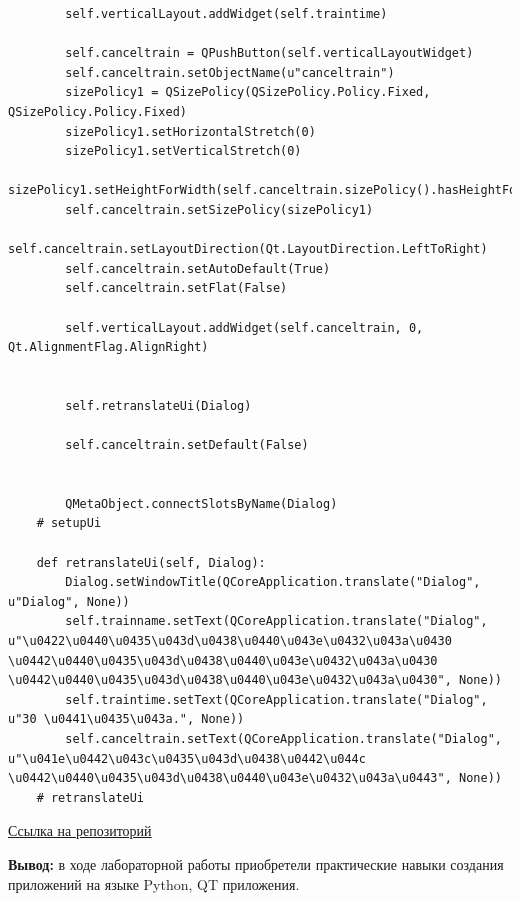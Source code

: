 \documentclass[a4paper,14pt]{extarticle}
\begin{document}
\begin{verbatim}
        self.verticalLayout.addWidget(self.traintime)

        self.canceltrain = QPushButton(self.verticalLayoutWidget)
        self.canceltrain.setObjectName(u"canceltrain")
        sizePolicy1 = QSizePolicy(QSizePolicy.Policy.Fixed, QSizePolicy.Policy.Fixed)
        sizePolicy1.setHorizontalStretch(0)
        sizePolicy1.setVerticalStretch(0)
        sizePolicy1.setHeightForWidth(self.canceltrain.sizePolicy().hasHeightForWidth())
        self.canceltrain.setSizePolicy(sizePolicy1)
        self.canceltrain.setLayoutDirection(Qt.LayoutDirection.LeftToRight)
        self.canceltrain.setAutoDefault(True)
        self.canceltrain.setFlat(False)

        self.verticalLayout.addWidget(self.canceltrain, 0, Qt.AlignmentFlag.AlignRight)


        self.retranslateUi(Dialog)

        self.canceltrain.setDefault(False)


        QMetaObject.connectSlotsByName(Dialog)
    # setupUi

    def retranslateUi(self, Dialog):
        Dialog.setWindowTitle(QCoreApplication.translate("Dialog", u"Dialog", None))
        self.trainname.setText(QCoreApplication.translate("Dialog", u"\u0422\u0440\u0435\u043d\u0438\u0440\u043e\u0432\u043a\u0430 \u0442\u0440\u0435\u043d\u0438\u0440\u043e\u0432\u043a\u0430 \u0442\u0440\u0435\u043d\u0438\u0440\u043e\u0432\u043a\u0430", None))
        self.traintime.setText(QCoreApplication.translate("Dialog", u"30 \u0441\u0435\u043a.", None))
        self.canceltrain.setText(QCoreApplication.translate("Dialog", u"\u041e\u0442\u043c\u0435\u043d\u0438\u0442\u044c \u0442\u0440\u0435\u043d\u0438\u0440\u043e\u0432\u043a\u0443", None))
    # retranslateUi
\end{verbatim}

\href{https://gitlab.com/vlad4052/2024_pv223_vladislav_10}{Ссылка на репозиторий}

\textbf{Вывод: } в ходе лабораторной работы приобретели практические навыки создания приложений на
языке Python, QT приложения.
\end{document}
